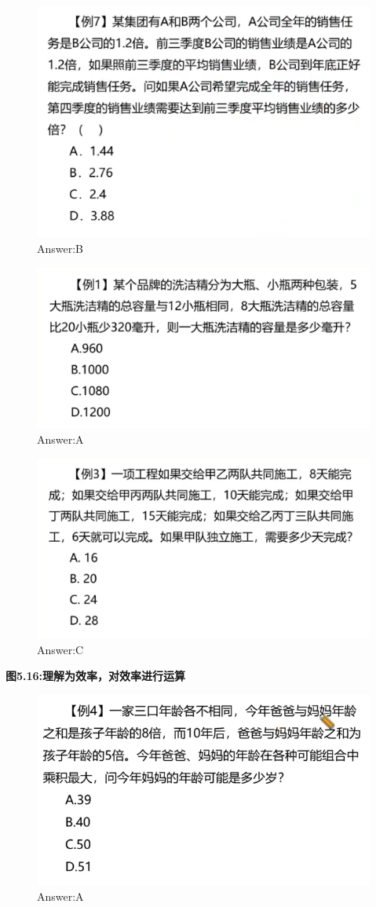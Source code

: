 \documentclass{article}
\numberwithin{equation}{section}						%
\numberwithin{figure}{section}							%
\begin{document}
\begin{sloppypar}
\begin{figure}[H]
     \centering
     \includegraphics[width=0.6\linewidth]{254.png}
		\caption{Answer:B}
\end{figure}

\begin{figure}[H]
     \centering
     \includegraphics[width=0.6\linewidth]{255.png}
		\caption{Answer:A}
\end{figure}

\begin{figure}[H]
     \centering
     \includegraphics[width=0.6\linewidth]{256.png}
		\caption{Answer:C}
\end{figure}

\textbf{图5.16:理解为效率，对效率进行运算}

\begin{figure}[H]
     \centering
     \includegraphics[width=0.6\linewidth]{257.png}
		\caption{Answer:A}
\end{figure}


\end{sloppypar}
\end{document}
